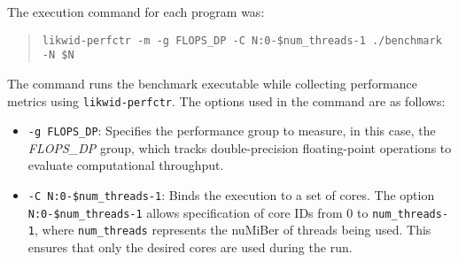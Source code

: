 The execution command for each program was:
\begin{quote}
\texttt{likwid-perfctr -m -g FLOPS\_DP -C N:0-\${num\_threads-1} ./benchmark -N \$N}
\end{quote}

The command runs the benchmark executable while collecting performance metrics using \texttt{likwid-perfctr}. The options used in the command are as follows:
\begin{itemize}
    \item \texttt{-g FLOPS\_DP}: Specifies the performance group to measure, in this case, the \textit{FLOPS\_DP} group, which tracks double-precision floating-point operations to evaluate computational throughput.
    \item \texttt{-C N:0-\${num\_threads-1}}: Binds the execution to a set of cores. The option \texttt{N:0-\${num\_threads-1}} allows specification of core IDs from 0 to \texttt{num\_threads-1}, where \texttt{num\_threads} represents the nuMiBer of threads being used. This ensures that only the desired cores are used during the run.
\end{itemize}

